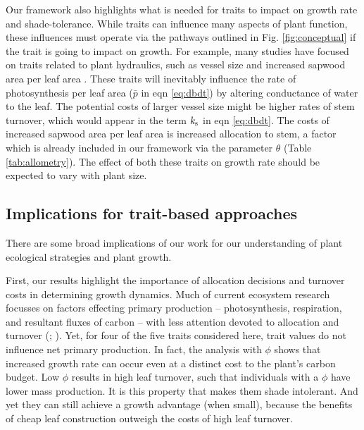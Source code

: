 \documentclass[a4paper,11pt]{article}
\begin{document}
Our framework also highlights what is needed for traits to impact on growth rate and shade-tolerance. While traits can influence many aspects of plant function, these  influences must operate via the pathways outlined in Fig. \ref{fig:conceptual} if the trait is going to impact on growth. For example, many studies have focused on traits related to plant hydraulics, such as vessel size and increased sapwood area per leaf area \citep{Zanne-2010}. These traits will inevitably influence the rate of photosynthesis per leaf area ($\bar{p}$ in eqn \ref{eq:dbdt}) by altering conductance of water to the leaf. The potential costs of larger vessel size might be higher rates of stem turnover, which would appear in the term $k_{\rm s}$ in eqn \ref{eq:dbdt}. The costs of increased sapwood area per leaf area is increased allocation to stem, a factor which is already included in our framework via the parameter $\theta$ (Table \ref{tab:allometry}). The effect of both these traits on growth rate should be expected to vary with plant size.


\subsection{Implications for trait-based approaches}

There are some broad implications of our work for our understanding of plant ecological strategies and plant growth.

First, our results highlight the importance of allocation decisions and turnover costs in determining growth dynamics.
Much of current ecosystem research focusses on factors effecting primary production -- photosynthesis, respiration, and resultant fluxes of carbon -- with less attention devoted to allocation and turnover (\citealp{Friend-2014}; \citealp[for comparisons of models see][]{Sitch-2008, DeKauwe-2014}). Yet, for four of the five traits considered here, trait values do not influence net primary production. In fact, the analysis with $\phi$ shows that increased growth rate can occur even at a distinct cost to the plant's carbon budget. Low $\phi$ results in high leaf turnover, such that individuals with a $\phi$ have lower mass production. It is this property that makes them shade intolerant. And yet they can still achieve a growth advantage (when small), because the benefits of cheap leaf construction outweigh the costs of high leaf turnover.
\end{document}
